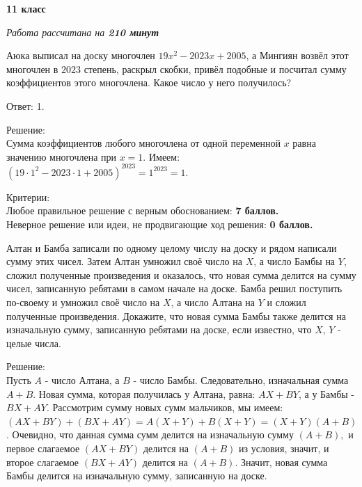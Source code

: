 \hspace{3mm}

\centerline{\bf \huge 11 класс}
\centerline{\normalsize{\it Работа рассчитана на \bf{210} минут}}

\hspace{3mm}

Аюка выписал на доску многочлен $19x^2 - 2023x + 2005$, а Мингиян возвёл этот многочлен в $2023$ степень, раскрыл скобки, привёл подобные и посчитал сумму коэффициентов этого многочлена. Какое число у него получилось?

\hspace{3mm}

Ответ: 1.

Решение:\\Сумма коэффициентов любого многочлена от одной переменной $x$ равна значению многочлена при $x = 1.$ 
Имеем: $(19\cdot1^2 - 2023\cdot1 + 2005)^{2023} = 1^{2023} = 1.$

\hspace{3mm}

Критерии:\\
Любое правильное решение с верным обоснованием: \textbf{7 баллов.}\\
Неверное решение или идеи, не продвигающие ход решения: \textbf{0 баллов.}

\hspace{3mm}


Алтан и Бамба записали по одному целому числу на доску и рядом написали сумму этих чисел. Затем Алтан умножил своё число на $X$, а число Бамбы на $Y$, сложил полученные произведения и оказалось, что новая сумма делится на сумму чисел, записанную ребятами в самом начале на доске. Бамба решил поступить по-своему и умножил своё число на $X$, а число Алтана на $Y$ и сложил полученные произведения. Докажите, что новая сумма Бамбы также делится на изначальную сумму, записанную ребятами на доске, если известно, что $X$, $Y$ - целые числа.

\hspace{3mm}

Решение:\\
Пусть $A$ - число Алтана, а $B$ - число Бамбы. Следовательно, изначальная сумма $A + B$. Новая сумма, которая получилась у Алтана, равна: $AX + BY$, а у Бамбы - $BX + AY$. Рассмотрим сумму новых сумм мальчиков, мы имеем:
$(AX + BY) + (BX + AY) = A(X + Y) + B(X + Y) = (X + Y)(A + B)$. Очевидно, что данная сумма сумм делится на изначальную сумму $(A + B),$ и первое слагаемое $(AX + BY)$ делится на $(A + B)$ из условия, значит, и второе слагаемое $(BX + AY)$ делится на $(A + B)$. Значит, новая сумма Бамбы делится на изначальную сумму, записанную на доске.

